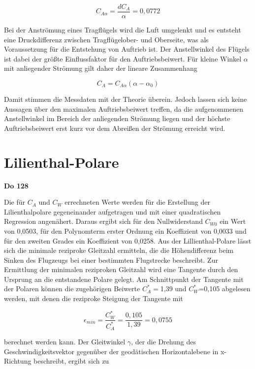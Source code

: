 \begin{equation}
C_{A\alpha}=\frac{dC_A}{\alpha}=0,0772
\end{equation}

	
Bei der Anströmung eines Tragflügels wird die Luft umgelenkt und es entsteht eine Druckdifferenz zwischen Tragflügelober- und Oberseite, was als Voraussetzung für die Entstehung von Auftrieb ist. Der Anstellwinkel des Flügels ist dabei der größte Einflussfaktor für den Auftriebsbeiwert. Für kleine Winkel $\alpha$ mit anliegender Strömung gilt daher der lineare Zusammenhang

\begin{equation}
C_A=C_{A\alpha} \left(\alpha - \alpha_0\right)
\end{equation}

Damit stimmen die Messdaten mit der Theorie überein. Jedoch lassen sich keine Aussagen über den maximalen Auftriebsbeiwert treffen, da die aufgenommenen Anstellwinkel im Bereich der anliegenden Strömung liegen und der höchste Auftriebsbeiwert erst kurz vor dem Abreißen der Strömung erreicht wird. 

\section{Lilienthal-Polare}

\textbf{Do 128}

Die für $C_A$ und $C_W$ errechneten Werte werden für die Erstellung der Lilienthalpolare gegeneinander aufgetragen und mit einer quadratischen Regression angenähert. Daraus ergibt sich für den Nullwiderstand $C_{W0}$ ein Wert von 0,0503, für den Polynomterm erster Ordnung ein Koeffizient von 0,0033 und für den zweiten Grades ein Koeffizient von 0,0258. 
Aus der Lillienthal-Polare lässt sich die minimale reziproke Gleitzahl ermitteln, die die Höhendifferenz beim Sinken des Flugzeugs bei einer bestimmten Flugstrecke beschreibt. Zur Ermittlung der minimalen reziproken Gleitzahl wird eine Tangente durch den Ursprung an die entstandene Polare gelegt. Am Schnittpunkt der Tangente mit der Polaren können die zugehörigen Beiwerte $C_A^*=$1,39 und  $C_W^*$=0,105 abgelesen werden, mit denen die reziproke Steigung der Tangente mit

\begin{equation}
\epsilon_{min} =  \frac {C_{W}^{\ast}} {C_{A}^{\ast}} = \frac{0,105} {1,39}=0,0755
\end{equation}

berechnet werden kann. Der Gleitwinkel $\gamma$, der die Drehung des Geschwindigkeitsvektor gegenüber der geodätischen Horizontalebene in x-Richtung beschreibt, ergibt sich zu

